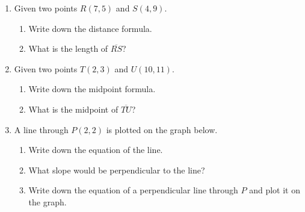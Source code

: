 \begin{enumerate}
\newpage
\item Given two points $R(7, 5)$ and $S(4, 9)$.
\begin{enumerate}
    \item Write down the distance formula. \vspace{1cm}
    \item What is the length of $\overline{RS}$?
\end{enumerate} \vspace{4cm}

\item Given two points $T(2, 3)$ and $U(10, 11)$.
\begin{enumerate}
    \item Write down the midpoint formula. \vspace{1cm}
    \item What is the midpoint of $\overline{TU}$?
\end{enumerate} \vspace{3cm}

\item A line through $P(2,2)$ is plotted on the graph below.
\begin{multicols}{2}
    \begin{enumerate}[itemsep=0.5cm]
      \item Write down the equation of the line. \vspace{0.5cm}
      \item What slope would be perpendicular to the line? \vspace{0.5cm}
      \item Write down the equation of a perpendicular line through $P$ and plot it on the graph. \vspace{1cm}
      \end{enumerate}
    \begin{flushright}
    \end{flushright}
  \end{multicols} \vspace{2cm}

\newpage


\end{enumerate}
